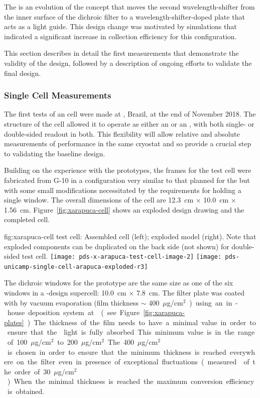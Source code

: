 The  is an evolution of the  concept that moves the second wavelength-shifter from the inner surface of the dichroic filter to a wavelength-shifter-doped plate that acts as a light guide. This design change was motivated by simulations that indicated a significant increase in collection efficiency for this configuration. 

This section describes in detail the first measurements that demonstrate the validity of the design, followed by a description of ongoing efforts to validate the final design.

\subsubsection{Single Cell  Measurements}
\label{sec:xarapuca-unicamp}

The first tests of an  cell were made at , Brazil, at the end of November 2018. 
The structure of the cell allowed it to operate as either an  or an , with both single- or double-sided readout in both.  This flexibility will allow relative and absolute measurements of performance in the same cryostat and so provide a crucial step to validating the baseline design.

Building on the experience with the  prototypes, the frames for the test cell were fabricated from \frfour G-10 in a configuration very similar to that planned for the  but with some small modifications necessitated by the requirements for holding a single window. The overall dimensions of the cell are \SI{12.3}{cm} $\times$ \SI{10.0}{cm} $\times$ \SI{1.56}{cm}. Figure~\ref{fig:xarapuca-cell} shows an exploded design drawing and the completed cell. 

\begin{dunefigure}{fig:xarapuca-cell}
{ test cell:  Assembled cell (left); exploded model (right).  Note that exploded components can be duplicated on the back side (not shown) for double-sided test cell.} 
	\texttt{[image: pds-x-arapuca-test-cell-image-2]}
	    \texttt{[image: pds-unicamp-single-cell-arapuca-exploded-r3]}
\end{dunefigure}

The dichroic windows for the prototype are the same size as one of the six windows in a -design  supercell: \SI{10.0}{cm} $\times$ \SI{7.8}{cm}. The filter plate was coated with  by vacuum evaporation (film thickness $\sim$ \SI{400}{${\mu}$g/cm$^2$})  using an in-house deposition system at  (see Figure \ref{fig:xarapuca-plates}). 
The thickness of the film needs to have a minimal value in order to ensure that the  light is fully absorbed. This minimum value is in the range of \SI{100}{${\mu}$g/cm$^2$} to \SI{200}{${\mu}$g/cm$^2$}. The  \SI{400}{${\mu}$g/cm$^2$} is chosen in order to ensure that the minimum thickness is reached everywhere on the filter even in presence of exceptional fluctuations (measured  of the order of \SI{30}{${\mu}$g/cm$^2$}). When the minimal thickness is reached the maximum conversion efficiency is obtained.

